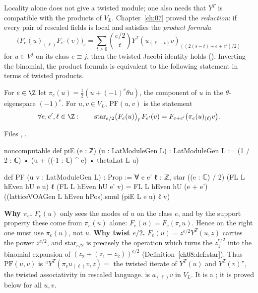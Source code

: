 Locality alone does not give a twisted module; one also needs that $Y^T$ is compatible with the
products of $V_L$.  Chapter~\ref{ch:07} proved the \emph{reduction}: if every pair of rescaled
fields is local and satisfies the \emph{product formula}
\begin{equation*}
  \bigl(F_e(u)_{(\ell)}F_{e'}(v)\bigr)_s=\sum_{t\ge0}\binom{e/2}{t}Y^T(u_{(\ell+t)}v)_{((2(s-t)+e+e')/2)}
\end{equation*}
for $u\in V^j$ on its class $e\equiv j$, then the twisted Jacobi identity holds
().  Inverting the binomial, the product formula is equivalent to
the following statement in terms of twisted products.

\begin{definition}\label{ch08:def:PF}
For $e\in\Z$ let $\pi_e(u)=\frac12(u+(-1)^e\theta u)$, the component of $u$ in the $\theta$-eigenspace
$(-1)^e$.  For $u,v\in V_L$, $\mathrm{PF}(u,v)$ is the statement
\begin{equation*}
  \forall e,e',\ell\in\Z:\qquad \mathrm{star}_{e/2}\bigl(F_e(u)\bigr)_{\ell}\,F_{e'}(v)
  =F_{e+e'}\bigl(\pi_e(u)_{(\ell)}v\bigr).
\end{equation*}
\end{definition}
\noindent Files , .
\begin{leancode}
noncomputable def piE (e : ℤ) (u : LatModuleGen L) : LatModuleGen L :=
  (1 / 2 : ℂ) • (u + ((-1 : ℂ) ^ e) • thetaLat L u)

def PF (u v : LatModuleGen L) : Prop :=
  ∀ e e' ℓ : ℤ, star ((e : ℂ) / 2) (FL L hEven hU e u) ℓ (FL L hEven hU e' v)
    = FL L hEven hU (e + e') ((latticeVOAGen L hEven hPos).smul (piE L e u) ℓ v)
\end{leancode}
\begin{dictionary}
\textbf{Why $\pi_e$.}  $F_e(u)$ only sees the modes of $u$ on the class $e$, and by the support
property these come from $\pi_e(u)$ alone: $F_e(u)=F_e(\pi_e u)$.  Hence on the right one must use
$\pi_e(u)$, not $u$.  \textbf{Why twist $e/2$.}  $F_e(u)=z^{e/2}Y^T(u,z)$ carries the power
$z^{e/2}$, and $\mathrm{star}_{e/2}$ is precisely the operation which turns the $z_1^{e/2}$ into the
binomial expansion of $(z_2+(z_1-z_2))^{e/2}$ (Definition~\ref{ch08:def:star}).  Thus
$\mathrm{PF}(u,v)$ is ``$Y^T(\pi_eu_{(\ell)}v,z)=$ the twisted iterate of $Y^T(u)$ and $Y^T(v)$'',
the twisted associativity in rescaled language.   is
$a_{(\ell)}v$ in $V_L$.  It is a ; it is proved below for all $u,v$.
\end{dictionary}

